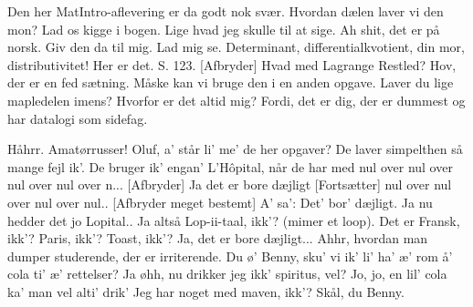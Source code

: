 \documentclass[a4paper,11pt]{article}
\begin{document}
\begin{sketch}



 Den her MatIntro-aflevering er da godt nok svær.
 Hvordan dælen laver vi den mon?
 Lad os kigge i bogen.
 Lige hvad jeg skulle til at sige.
 Ah shit, det er på norsk.
 Giv den da til mig. Lad mig se. Determinant, differentialkvotient, din mor, distributivitet! Her er det. S. 123.
[Afbryder] Hvad med Lagrange Restled?
 Hov, der er en fed sætning. Måske kan vi bruge den i en anden opgave.  Laver du lige mapledelen imens?
 Hvorfor er det altid mig?
 Fordi, det er dig, der er dummest og har datalogi som sidefag.


 Håhrr. Amatørrusser!
 Oluf, a' står li' me' de her opgaver? De laver simpelthen så mange fejl ik'. De bruger ik' engan' L'Hôpital, når de har med nul over nul over nul over nul over n...
[Afbryder] Ja det er bore dæjligt
[Fortsætter] nul over nul over nul over nul..
[Afbryder meget bestemt] A' sa': Det' bor' dæjligt.
 Ja nu hedder det jo Lopital..
 Ja altså Lop-ii-taal, ikk'? (mimer et loop). Det er Fransk, ikk'? Paris, ikk'? Toast, ikk'?
 Ja, det er bore dæjligt...
 Ahhr, hvordan man dumper studerende, der er irriterende.
 Du ø' Benny, sku' vi ik' li' ha' æ' rom å' cola ti' æ' rettelser?
 Ja øhh, nu drikker jeg ikk' spiritus, vel?
 Jo, jo, en lil' cola ka' man vel alti' drik'
 Jeg har noget med maven, ikk'?
 Skål, du Benny.


\end{sketch}
\end{document}
